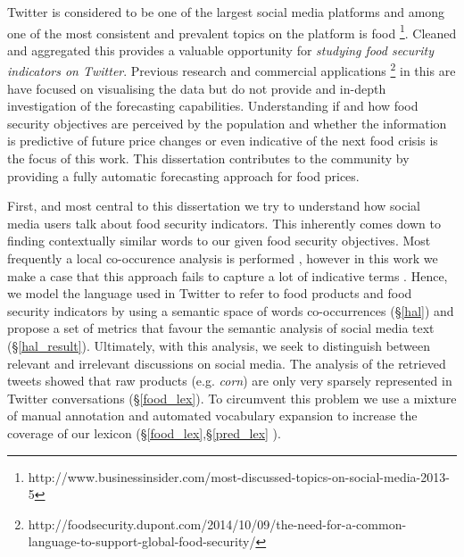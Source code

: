 Twitter is considered to be one of the largest social media platforms and among one of the most consistent and prevalent topics on the platform is food \footnote{http://www.businessinsider.com/most-discussed-topics-on-social-media-2013-5}. Cleaned and aggregated this provides a valuable opportunity for \emph{studying food security indicators on Twitter}. Previous research  \cite{ungp2013} and commercial applications \footnote{http://foodsecurity.dupont.com/2014/10/09/the-need-for-a-common-language-to-support-global-food-security/} in this are have focused on visualising the data but do not provide and in-depth investigation of the forecasting capabilities. Understanding if and how food security objectives are perceived by the population and whether the information is predictive of future price changes or even indicative of the next food crisis is the focus of this work. This dissertation contributes to the community by providing a fully automatic forecasting approach for food prices. 

\newpage 



First, and most central to this dissertation we try to understand how social media users talk about food security indicators. This inherently comes down to finding contextually similar words to our given food security objectives. Most frequently a local co-occurence analysis is performed \cite{AbbarMW14}, however in this work we make a case that this approach fails to capture a lot of indicative terms \cite{burgess98}. Hence, we model the language used in Twitter to refer to food products and food security indicators by using a semantic space of words co-occurrences (\S\ref{hal}) and propose a set of metrics that favour the semantic analysis of social media text  (\S\ref{hal_result}). Ultimately, with this analysis, we seek to distinguish between relevant and irrelevant discussions on social media. The analysis of the retrieved tweets showed that raw products (e.g. \emph{corn}) are only very sparsely represented in Twitter conversations (\S\ref{food_lex}). To circumvent this problem we use a mixture of manual annotation and automated vocabulary expansion to increase the coverage of our lexicon (\S\ref{food_lex},\S\ref{pred_lex} ).

